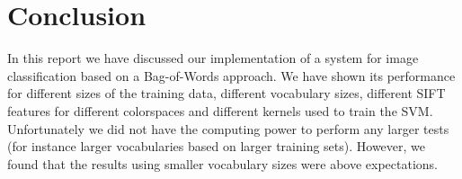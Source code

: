 \documentclass[11pt]{article}
\begin{document}
\section{Conclusion}
In this report we have discussed our implementation of a system for image classification based on a Bag-of-Words approach. We have shown its performance for different sizes of the training data, different vocabulary sizes, different SIFT features for different colorspaces and different kernels used to train the SVM. Unfortunately we did not have the computing power to perform any larger tests (for instance larger vocabularies based on larger training sets). However, we found that the results using smaller vocabulary sizes were above expectations. 
\end{document}
